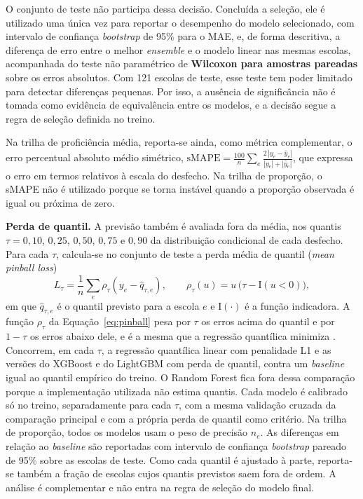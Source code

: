 O conjunto de teste não participa dessa decisão. Concluída a seleção, ele é
utilizado uma única vez para reportar o desempenho do modelo selecionado, com
intervalo de confiança \textit{bootstrap} de 95\% para o MAE, e, de forma
descritiva, a diferença de erro entre o melhor \textit{ensemble} e o modelo
linear nas mesmas escolas, acompanhada do teste não paramétrico de
\textbf{Wilcoxon para amostras pareadas} sobre os erros absolutos. Com
121 escolas de teste, esse teste tem poder limitado para detectar
diferenças pequenas. Por isso, a ausência de significância não é tomada
como evidência de equivalência entre os modelos, e a decisão segue a regra
de seleção definida no treino.

Na trilha de proficiência média, reporta-se ainda, como métrica
complementar, o erro percentual absoluto médio simétrico,
$\text{sMAPE} = \frac{100}{n}\sum_{e} \frac{2\,|y_e - \hat{y}_e|}{|y_e| + |\hat{y}_e|}$,
que expressa o erro em termos relativos à escala do desfecho. Na trilha de
proporção, o sMAPE não é utilizado porque se torna instável quando a
proporção observada é igual ou próxima de zero.

\textbf{Perda de quantil.} A previsão também é avaliada fora da média, nos
quantis $\tau = 0{,}10$, $0{,}25$, $0{,}50$, $0{,}75$ e $0{,}90$ da
distribuição condicional de cada desfecho. Para cada $\tau$, calcula-se no
conjunto de teste a perda média de quantil (\textit{mean pinball loss})
\begin{equation}
    L_\tau = \frac{1}{n}\sum_{e} \rho_\tau\left(y_e - \hat{q}_{\tau,e}\right),
    \qquad \rho_\tau(u) = u\,\bigl(\tau - \mathrm{I}(u < 0)\bigr),
    \label{eq:pinball}
\end{equation}
em que $\hat{q}_{\tau,e}$ é o quantil previsto para a escola $e$ e
$\mathrm{I}(\cdot)$ é a função indicadora. A função $\rho_\tau$ da
Equação~\ref{eq:pinball} pesa por
$\tau$ os erros acima do quantil e por $1-\tau$ os erros abaixo dele, e é a
mesma que a regressão quantílica minimiza \cite{koenker2005quantile}.
Concorrem, em cada $\tau$, a regressão quantílica linear com penalidade L1 e
as versões do XGBoost e do LightGBM com perda de quantil, contra um
\textit{baseline} igual ao quantil empírico do treino. O Random Forest fica
fora dessa comparação porque a implementação utilizada não estima quantis.
Cada modelo é calibrado só no treino, separadamente para cada $\tau$, com a
mesma validação cruzada da comparação principal e com a própria perda de
quantil como critério. Na trilha de proporção, todos os modelos usam o peso
de precisão $n_e$. As diferenças em relação ao \textit{baseline} são
reportadas com intervalo de confiança \textit{bootstrap} pareado de 95\%
sobre as escolas de teste. Como cada quantil é ajustado à parte, reporta-se
também a fração de escolas cujos quantis previstos saem fora de ordem. A
análise é complementar e não entra na regra de seleção do modelo final.


